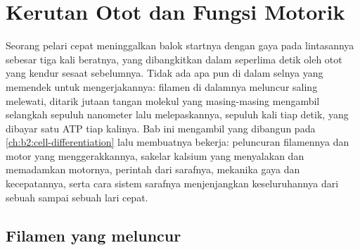 \chapter{Kerutan Otot dan Fungsi Motorik}\label{ch:b2:muscle-movement}

Seorang pelari cepat meninggalkan balok startnya dengan gaya pada
lintasannya sebesar tiga kali beratnya, yang dibangkitkan dalam
seperlima detik oleh otot yang kendur sesaat sebelumnya. Tidak ada apa
pun di dalam selnya yang memendek untuk mengerjakannya: filamen di
dalamnya meluncur saling melewati, ditarik jutaan tangan molekul yang
masing-masing mengambil selangkah sepuluh nanometer lalu melepaskannya,
sepuluh kali tiap detik, yang dibayar satu ATP tiap kalinya. Bab ini
mengambil  yang dibangun pada
\cref{ch:b2:cell-differentiation} lalu membuatnya bekerja: peluncuran
filamennya dan motor yang menggerakkannya, sakelar kalsium yang
menyalakan dan memadamkan motornya, perintah dari sarafnya, mekanika
gaya dan kecepatannya, serta cara sistem sarafnya menjenjangkan
keseluruhannya dari sebuah  sampai sebuah lari cepat.

\section{Filamen yang meluncur}

